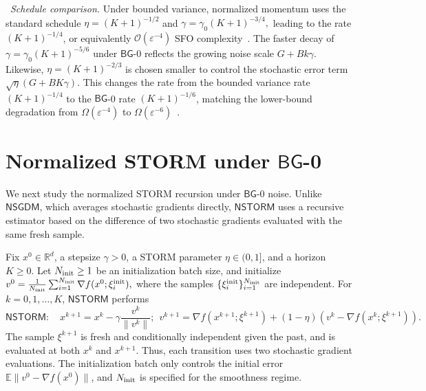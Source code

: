 \documentclass[letter,11pt]{article}
\newcommand{\E}{\mathbb{E}}
\newcommand{\R}{\mathbb{R}}
\newcommand{\Ocal}{\mathcal{O}}
\begin{document}
\noindent \textbullet\  \textit{Schedule comparison.} Under bounded variance, normalized momentum uses the standard schedule $\eta=(K+1)^{-1/2}$ and $\gamma=\gamma_0(K+1)^{-3/4},$ leading to the rate $(K+1)^{-1/4}$, or equivalently
$\Ocal(\varepsilon^{-4})$ SFO complexity~\cite{cutkosky2020momentum,khirirat2026error}. The faster decay of $\gamma=\gamma_0(K+1)^{-5/6}$ under $\mathsf{BG}$-0 reflects the growing noise scale $G+B k\gamma$. Likewise, $\eta=(K+1)^{-2/3}$ is chosen smaller to control the stochastic error term $\sqrt{\eta}(G+BK\gamma)$. This changes the rate from the bounded variance rate $(K+1)^{-1/4}$ to the $\mathsf{BG}$-0 rate $(K+1)^{-1/6}$, matching the lower-bound degradation from $\Omega(\varepsilon^{-4})$ to $\Omega(\varepsilon^{-6})$~\cite{fazla2026lower}.
\section{Normalized STORM under \texorpdfstring{$\mathsf{BG}$}{BG}-0}
\label{sec:NSTORM}
We next study the normalized STORM recursion under $\mathsf{BG}$-0 noise. Unlike $\mathsf{NSGDM}$, which averages stochastic gradients directly, $\mathsf{NSTORM}$ uses a recursive estimator based on the difference of two stochastic gradients evaluated with the same fresh sample.

Fix $x^0\in\R^d$, a stepsize $\gamma>0$, a STORM parameter $\eta\in(0,1]$, and a horizon $K\ge0$. Let $N_{\rm init}\ge1$ be an initialization batch size, and initialize $v^0 = \frac1{N_{\rm init}} \sum_{i=1}^{N_{\rm init}} \nabla f(x^0;\xi_i^{\rm init}),$ where the samples $\{\xi_i^{\rm init}\}_{i=1}^{N_{\rm init}}$ are independent. For $k=0,1,\ldots,K$, $\mathsf{NSTORM}$ performs
\begin{equation}
\label{eq:nstorm_updates}
\mathsf{NSTORM:}\quad
x^{k+1} = x^k-\gamma\frac{v^k}{\|v^k\|};
\ \ 
v^{k+1} = \nabla f(x^{k+1};\xi^{k+1}) + (1-\eta) \left(v^k-\nabla f(x^k;\xi^{k+1})\right).
\end{equation}
The sample $\xi^{k+1}$ is fresh and conditionally independent given the past, and is evaluated at both $x^k$ and $x^{k+1}$. Thus, each transition uses two stochastic gradient evaluations. The initialization batch only controls the initial error $\E\|v^0-\nabla f(x^0)\|$, and $N_{\rm init}$ is specified for the smoothness regime.
\end{document}

